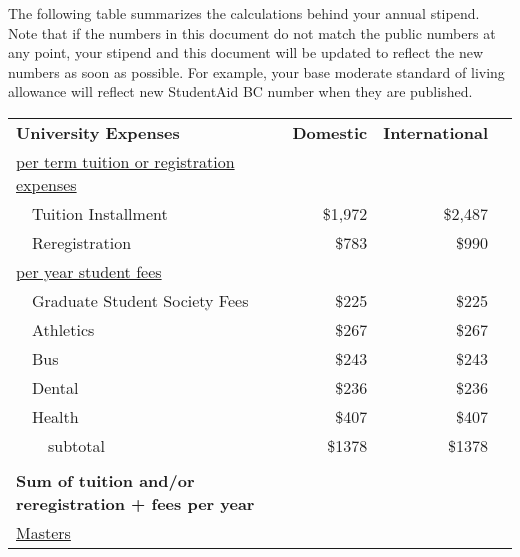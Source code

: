 \documentclass[11pt]{article}
\begin{document}
The following table summarizes the calculations behind your annual stipend.
Note that if the numbers in this document do not match the public numbers at any point, your stipend and this document will be updated to reflect the new numbers as soon as possible.
For example, your base moderate standard of living allowance will reflect new StudentAid BC number when they are published.
\begin{center}
	\begin{tabular}{lrrr}
		\textbf{University Expenses}                                    & \textbf{Domestic} & \textbf{International}   \\
		\underline{per term tuition or registration expenses}           &                   &                          \\
		~~Tuition Installment                                           & \$1,972           & \$2,487                  \\
		~~Reregistration                                                & \$783             & \$990                    \\
		\underline{per year student fees}                               &                   &                          \\
		~~Graduate Student Society Fees                                 & \$225             & \$225                    \\
		~~Athletics                                                     & \$267             & \$267                    \\
		~~Bus                                                           & \$243             & \$243                    \\
		~~Dental                                                        & \$236             & \$236                    \\
		~~Health                                                        & \$407             & \$407                    \\
		~~~~{subtotal}                                                  & \$1378            & \$1378                   \\
		                                                                &                   &                        & \\
		\textbf{Sum of tuition and/or reregistration + fees per year}   &                   &                          \\
		\underline{Masters}                                             &                   &                          \\

\end{tabular}
\end{center}
\end{document}
